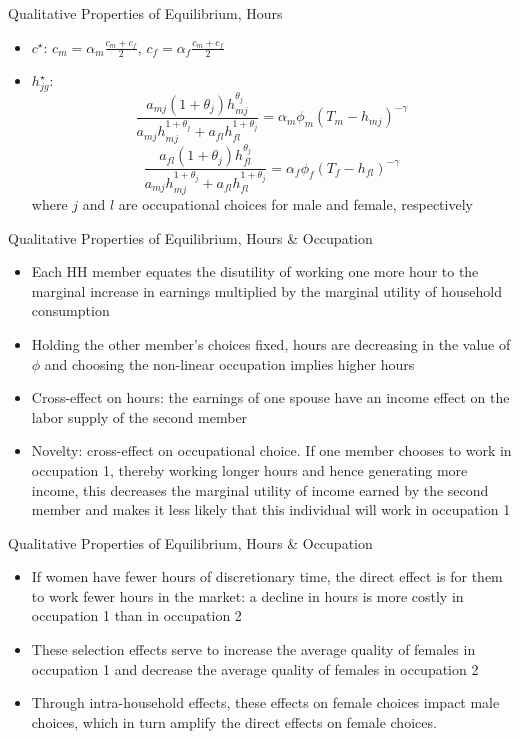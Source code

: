 \documentclass[hyperref={bookmarks=false}]{beamer}
\begin{document}
\begin{frame}{Qualitative Properties of Equilibrium, Hours}
\begin{itemize}
\setlength{\itemsep}{0.35 cm}
\item $c^{\star}$: $c_m=\alpha_m\frac{c_m+c_f}{2}$, $c_f=\alpha_f\frac{c_m+c_f}{2}$\\
\item $h_{jg}^{\star}$:
\begin{equation}
\frac{a_{mj}(1+\theta_{j})h_{mj}^{\theta_j}}{a_{mj}h_{mj}^{1+\theta_j}+a_{fl}h_{fl}^{1+\theta_j}}=\alpha_{m}\phi_{m}(T_{m}-h_{mj})^{-\gamma}
\end{equation} 
\begin{equation}
\frac{a_{fl}(1+\theta_{j})h_{fl}^{\theta_j}}{a_{mj}h_{mj}^{1+\theta_j}+a_{fl}h_{fl}^{1+\theta_j}}=\alpha_{f}\phi_{f}(T_{f}-h_{fl})^{-\gamma}
\end{equation} 
where $j$ and $l$ are occupational choices for male and female, respectively
\end{itemize}
\end{frame}

\begin{frame}{Qualitative Properties of Equilibrium, Hours \& Occupation}
\begin{itemize}
\setlength{\itemsep}{0.15 cm}
\item Each HH member equates the disutility of working one more hour to the marginal increase in earnings multiplied by the marginal utility of household consumption
\item Holding the other member’s choices fixed, hours are decreasing in the value of
$\phi$ and choosing the non-linear occupation implies higher hours
\item Cross-effect on hours: the earnings of one spouse have an income effect on the labor supply of the second member
\item Novelty: cross-effect on occupational choice. If one member chooses to work in occupation 1, thereby working longer hours and hence generating more income, this decreases the marginal utility of income earned by the second member and makes it less likely that this individual will work in occupation 1
\end{itemize}
\end{frame}

\begin{frame}{Qualitative Properties of Equilibrium, Hours \& Occupation}
\begin{itemize}
\setlength{\itemsep}{0.35 cm}
\item If women have fewer hours of discretionary time, the direct effect is for them to work fewer hours in the market: a decline in hours is more costly in occupation 1 than in occupation 2
\item These selection effects serve to increase the average quality of females in occupation 1 and decrease the average quality of females in occupation 2
\item Through intra-household effects, these effects on female choices impact male choices, which in turn amplify the direct effects on female choices.
\end{itemize}
\end{frame}
\end{document}
